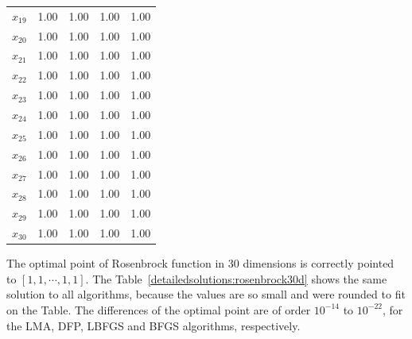 \documentclass[conference]{IEEEtran}
\begin{document}
\begin{table}[H]
\begin{tabular}{lrrrr}
$x_{19}$ &     1.00 &     1.00 &     1.00 &     1.00 \\
$x_{20}$ &     1.00 &     1.00 &     1.00 &     1.00 \\
$x_{21}$ &     1.00 &     1.00 &     1.00 &     1.00 \\
$x_{22}$ &     1.00 &     1.00 &     1.00 &     1.00 \\
$x_{23}$ &     1.00 &     1.00 &     1.00 &     1.00 \\
$x_{24}$ &     1.00 &     1.00 &     1.00 &     1.00 \\
$x_{25}$ &     1.00 &     1.00 &     1.00 &     1.00 \\
$x_{26}$ &     1.00 &     1.00 &     1.00 &     1.00 \\
$x_{27}$ &     1.00 &     1.00 &     1.00 &     1.00 \\
$x_{28}$ &     1.00 &     1.00 &     1.00 &     1.00 \\
$x_{29}$ &     1.00 &     1.00 &     1.00 &     1.00 \\
$x_{30}$ &     1.00 &     1.00 &     1.00 &     1.00 \\
\bottomrule
\end{tabular}
\end{table}

The optimal point of Rosenbrock function in 30 dimensions is correctly pointed to $\left[1, 1, \cdots , 1, 1\right]$. The Table~\ref{detailedsolutions:rosenbrock30d}
shows the same solution to all algorithms, because the values are so small and were rounded to fit on the Table. The differences of
the optimal point are of order $10^{-14}$ to $10^{-22}$, for the LMA, DFP, LBFGS and BFGS algorithms, respectively.
\end{document}
